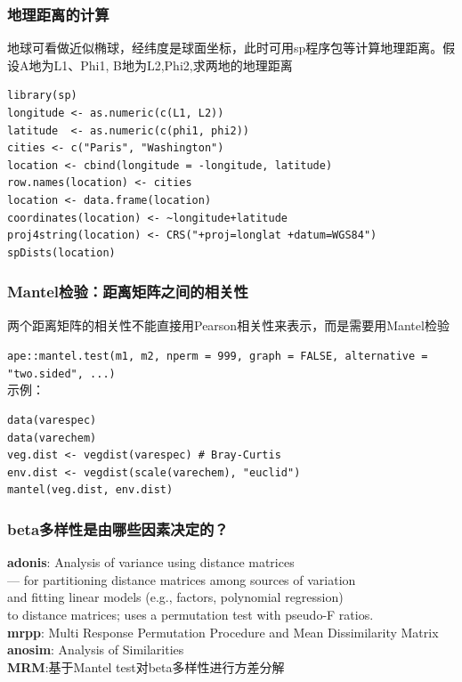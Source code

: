 \documentclass[UTF8]{ctexbeamer}
\begin{document}
\begin{frame}[fragile]
\frametitle{地理距离的计算}
地球可看做近似椭球，经纬度是球面坐标，此时可用sp程序包等计算地理距离。假设A地为L1、Phi1, B地为L2,Phi2,求两地的地理距离\\
\begin{verbatim}
library(sp)
longitude <- as.numeric(c(L1, L2))
latitude  <- as.numeric(c(phi1, phi2))
cities <- c("Paris", "Washington")
location <- cbind(longitude = -longitude, latitude)
row.names(location) <- cities
location <- data.frame(location)
coordinates(location) <- ~longitude+latitude
proj4string(location) <- CRS("+proj=longlat +datum=WGS84") 
spDists(location)
\end{verbatim}

\end{frame}


\begin{frame}[fragile]
\frametitle{Mantel检验：距离矩阵之间的相关性}
两个距离矩阵的相关性不能直接用Pearson相关性来表示，而是需要用Mantel检验

{\tt ape::mantel.test(m1, m2, nperm = 999, graph = FALSE, alternative = "two.sided",  ...)}\\

示例：
\begin{verbatim}
data(varespec)
data(varechem)
veg.dist <- vegdist(varespec) # Bray-Curtis
env.dist <- vegdist(scale(varechem), "euclid")
mantel(veg.dist, env.dist)
\end{verbatim}

\end{frame}

\begin{frame}
\frametitle{beta多样性是由哪些因素决定的？}

{\color{blue}\textbf{adonis}}: Analysis of variance using distance matrices\\
 — for partitioning distance matrices among sources of variation\\
 and fitting linear models (e.g., factors, polynomial regression)\\
 to distance matrices; uses a permutation test with pseudo-F ratios.\\
{\color{blue}\textbf{mrpp}}: Multi Response Permutation Procedure and Mean Dissimilarity Matrix\\
{\color{blue}\textbf{anosim}}: Analysis of Similarities\\
{\color{blue}\textbf{MRM}}:基于Mantel test对beta多样性进行方差分解 
\end{frame}
\end{document}
